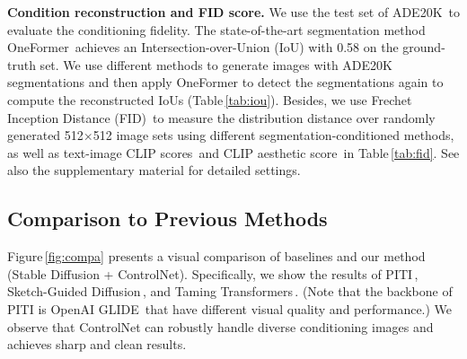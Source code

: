 \documentclass[10pt,twocolumn,letterpaper]{article}
\def\para#1{\vspace{0.25em}\noindent\textbf{#1}}
\begin{document}
	\begin{table}[!t]
		\centering
		\vspace{-7pt}
		\caption{Evaluation for image generation conditioned by semantic segmentation. We report FID, CLIP text-image score, and CLIP aesthetic scores for our method and other baselines. We also report the performance of Stable Diffusion without segmentation conditions. Methods marked with ``*'' are trained from scratch.}
		\vspace{-9pt}
		\label{tab:fid}
	\end{table}
	
	\para{Condition reconstruction and FID score.}
	We use the test set of ADE20K\,\cite{zhou2017scene} to evaluate the conditioning fidelity.
	The state-of-the-art segmentation method OneFormer\,\cite{jain2022oneformer} achieves an Intersection-over-Union (IoU) with 0.58 on the ground-truth set.
	We use different methods to generate images with ADE20K segmentations and then apply OneFormer to detect the segmentations again to compute the reconstructed IoUs (Table\,\ref{tab:iou}).
	Besides, we use Frechet Inception Distance (FID)\,\cite{NIPS2017_8a1d6947} to measure the distribution distance over randomly generated 512$\times$512 image sets using different segmentation-conditioned methods, as well as text-image CLIP scores\,\cite{radford2021learning} and CLIP aesthetic score\,\cite{schuhmann2022laionb} in Table\,\ref{tab:fid}. See also the supplementary material for detailed settings.
	
	\subsection{Comparison to Previous Methods}
	Figure\,\ref{fig:compa} presents a visual comparison of baselines and our method (Stable Diffusion + ControlNet). Specifically, we show the results of PITI\,\cite{wang2022pretraining}, Sketch-Guided Diffusion\,\cite{voynov2022sketch}, and Taming Transformers\,\cite{esser2021taming}. (Note that the backbone of PITI is OpenAI GLIDE\,\cite{glide} that have different visual quality and performance.)
	We observe that ControlNet can robustly handle diverse conditioning images and achieves sharp and clean results.
	
\end{document}
